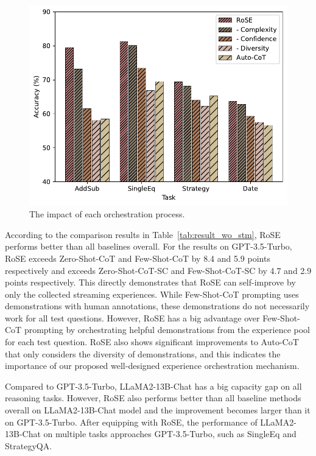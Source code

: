 \documentclass[11pt]{article}
\begin{document}
\begin{figure}[ht]
    \centering
    \includegraphics[width=\linewidth]{pics/component.pdf}
    \caption{The impact of each orchestration process.}
    \label{fig:process}
\end{figure}

\label{analysis}

According to the comparison results in Table~\ref{tab:result_wo_stm}, RoSE performs better than all baselines overall. For the results on GPT-3.5-Turbo, RoSE exceeds Zero-Shot-CoT and Few-Shot-CoT by 8.4 and 5.9 points respectively and exceeds Zero-Shot-CoT-SC and Few-Shot-CoT-SC by 4.7 and 2.9 points respectively. This directly demonstrates that RoSE can self-improve by only the collected streaming experiences. While Few-Shot-CoT prompting uses demonstrations with human annotations, these demonstrations do not necessarily work for all test questions. However, RoSE has a big advantage over Few-Shot-CoT prompting by orchestrating helpful demonstrations from the experience pool for each test question. RoSE also shows significant improvements to Auto-CoT that only considers the diversity of demonstrations, and this indicates the importance of our proposed well-designed experience orchestration mechanism. 

Compared to GPT-3.5-Turbo, LLaMA2-13B-Chat has a big capacity gap on all reasoning tasks. However, RoSE also performs better than all baseline methods overall on LLaMA2-13B-Chat model and the improvement becomes larger than it on GPT-3.5-Turbo. After equipping with RoSE, the performance of LLaMA2-13B-Chat on multiple tasks approaches GPT-3.5-Turbo, such as SingleEq and StrategyQA.
\end{document}
